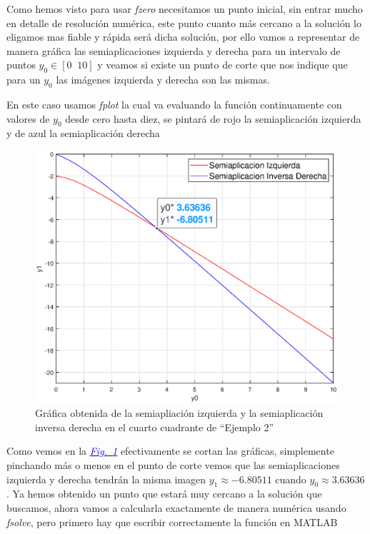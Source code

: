 \documentclass[12pt,a4paper]{report} %
\newcommand{\fref}[1]{\hyperref[#1]{\textcolor{blue}{\textit{Fig.~\ref*{#1}}}}}
\begin{document}
	Como hemos visto para usar \textit{fzero} necesitamos un punto inicial, sin entrar mucho en detalle de resolución numérica, este punto cuanto más cercano a la solución lo eligamos mas fiable y rápida será dicha solución, por ello vamos a representar de manera gráfica las semiaplicaciones izquierda y derecha para un intervalo de puntos $y_0 \in [0\;\;10]$ y veamos si existe un punto de corte que nos indique que para un $y_0$ las imágenes izquierda y derecha son las mismas.
	
	\vspace{1cm}
	
	\vspace{1cm}En este caso usamos \textit{fplot} la cual va evaluando la función continuamente con valores de $y_0$ desde cero hasta diez, se pintará de rojo la semiaplicación izquierda y de azul la semiaplicación derecha 
	\newpage
	
	\begin{figure}[h]
		\centering
		\includegraphics[width=1\textwidth]{g1ejem2.eps}
		\caption{Gráfica obtenida de la semiapliación izquierda y la semiaplicación inversa derecha en el cuarto cuadrante de ``Ejemplo 2''}
		\label{fig:ejem2_2}
	\end{figure}\smallskip
	
	Como vemos en la \fref{fig:ejem2_2} efectivamente se cortan las gráficas, simplemente pinchando más o menos en el punto de corte vemos que las semiaplicaciones izquierda y derecha tendrán la misma imagen $y_1\approx-6.80511$ cuando $y_0\approx3.63636$.
	\newpage
	Ya hemos obtenido un punto que estará muy cercano a la solución que buscamos, ahora vamos a calcularla exactamente de manera numérica usando \textit{fsolve}, pero primero hay que escribir correctamente la función en MATLAB
	
\end{document}

